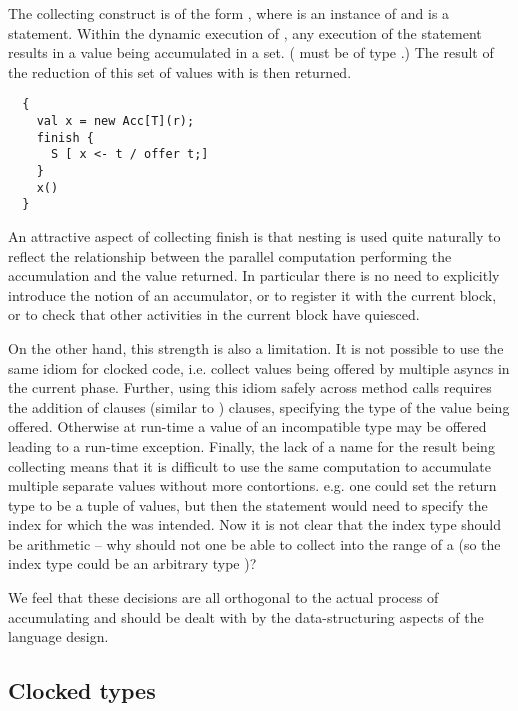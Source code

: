 The collecting  construct is of the form , where  is an instance of  and
 is a statement. Within the dynamic execution of , any
execution of the statement  results in a value 
being accumulated in a set. ( must be of type .) The
result of the reduction of this set of  values with 
is then returned. 

\begin{lstlisting}
  {
    val x = new Acc[T](r);
    finish {
      S [ x <- t / offer t;]
    }
    x()
  }
\end{lstlisting}

An attractive aspect of collecting finish is that nesting is used
quite naturally to reflect the relationship between the parallel
computation performing the accumulation and the value returned. In
particular there is no need to explicitly introduce the notion of an
accumulator, or to register it with the current block, or to check
that other activities in the current block have quiesced. 

On the other hand, this strength is also a limitation. It is not
possible to use the same idiom for clocked code, i.e.{} collect values
being offered by multiple  asyncs in the current phase.
Further, using this idiom safely across method calls requires the
addition of  clauses (similar to )
clauses, specifying the type of the value being offered. Otherwise at
run-time a value of an incompatible type may be offered leading to a
run-time exception. Finally, the lack of a name for the result being
collecting means that it is difficult to use the same computation to
accumulate multiple separate values without more contortions. e.g.{}
one could set the return type to be a tuple of values, but then the
 statement would need to specify the index for which the
 was intended. Now it is not clear that the index type
should be arithmetic -- why should not one be able to collect into the
range of a  (so the index type could be an arbitrary
type )? 

We feel that these decisions are all orthogonal to the actual process
of accumulating and should be dealt with by the data-structuring
aspects of the language design.

\subsection{Clocked types}

